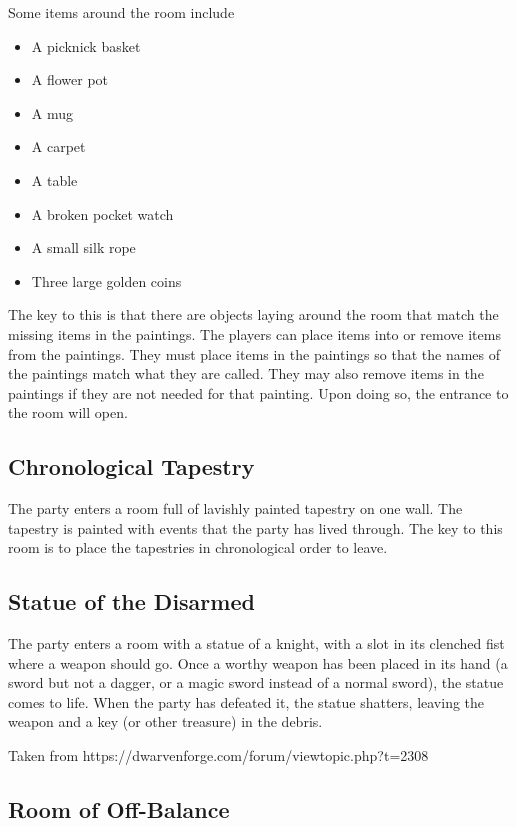 Some items around the room include

\begin{multicols}{3}
	\begin{itemize}
		\item A picknick basket
		\item A flower pot
		\item A mug
		\item A carpet
		\item A table
		\item A broken pocket watch
		\item A small silk rope
		\item Three large golden coins
	\end{itemize}
\end{multicols}

The key to this is that there are objects laying around the room that match the missing items in the paintings. The players can place items into or remove items from the paintings. They must place items in the paintings so that the names of the paintings match what they are called. They may also remove items in the paintings if they are not needed for that painting. Upon doing so, the entrance to the room will open.

\subsection{Chronological Tapestry}

The party enters a room full of lavishly painted tapestry on one wall. The tapestry is painted with events that the party has lived through. The key to this room is to place the tapestries in chronological order to leave.

\subsection{Statue of the Disarmed}

The party enters a room with a statue of a knight, with a slot in its clenched fist where a weapon should go. Once a worthy weapon has been placed in its hand (a sword but not a dagger, or a magic sword instead of a normal sword), the statue comes to life. When the party has defeated it, the statue shatters, leaving the weapon and a key (or other treasure) in the debris.

Taken from https://dwarvenforge.com/forum/viewtopic.php?t=2308

\subsection{Room of Off-Balance}

